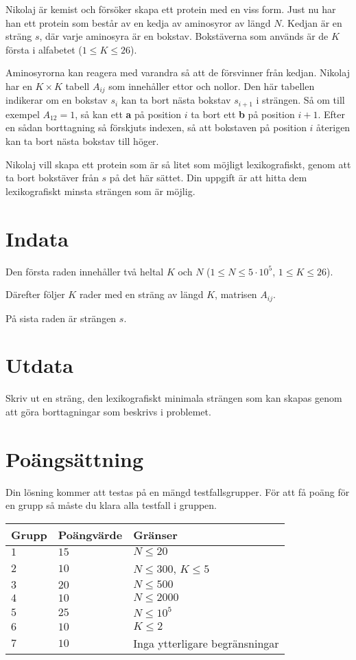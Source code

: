 
Nikolaj är kemist och försöker skapa ett protein med en viss form. Just nu har han ett protein
som består av en kedja av aminosyror av längd $N$. Kedjan är en sträng $s$, där 
varje aminosyra är en bokstav.
Bokstäverna som används är de $K$ första i alfabetet ($1 \leq K \leq 26$).

Aminosyrorna kan reagera med varandra så att de försvinner från kedjan. Nikolaj har en $K \times K$ tabell
$A_{ij}$ som innehåller ettor och nollor. Den här tabellen indikerar om en bokstav $s_i$ kan ta
bort nästa bokstav $s_{i+1}$ i strängen. Så om till exempel $A_{12} = 1$, så kan ett \textbf{a} på
position $i$ ta bort ett \textbf{b} på position $i+1$. Efter en sådan borttagning så förskjuts 
indexen, så att bokstaven på position $i$ återigen kan ta bort nästa bokstav till höger.

Nikolaj vill skapa ett protein som är så litet som möjligt lexikografiskt, genom att ta bort 
bokstäver från $s$ på det här sättet. Din uppgift är att hitta dem lexikografiskt minsta
strängen som är möjlig.

\section*{Indata}

Den första raden innehåller två heltal $K$ och $N$ ($1 \leq N \leq 5 \cdot 10^5$, $1 \leq K \leq 26$).

Därefter följer $K$ rader med en sträng av längd $K$, matrisen $A_{ij}$.

På sista raden är strängen $s$.

\section*{Utdata}
Skriv ut en sträng, den lexikografiskt minimala strängen som kan skapas genom att göra borttagningar
som beskrivs i problemet.

\section*{Poängsättning}
Din lösning kommer att testas på en mängd testfallsgrupper.
För att få poäng för en grupp så måste du klara alla testfall i gruppen.

\noindent
\begin{tabular}{| l | l | p{12cm} |}
  \hline
  Grupp & Poängvärde & Gränser \\ \hline
 
  $1$   & $15$       & $N \leq 20$\\ \hline
  $2$   & $10$       & $N \leq 300$, $K \leq 5$  \\ \hline
  $3$   & $20$       & $N \leq 500$ \\ \hline
  $4$   & $10$       & $N \leq 2000$ \\ \hline
  $5$   & $25$       & $N \leq 10^5$ \\ \hline
  $6$   & $10$       & $K \leq 2$ \\ \hline
  $7$   & $10$       & Inga ytterligare begränsningar \\ \hline
\end{tabular}
